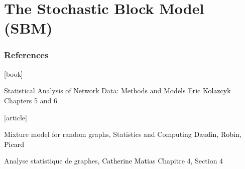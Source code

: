 \documentclass{beamer}\usepackage[]{graphicx}\usepackage[]{color}
\begin{document}
\section{The Stochastic Block Model (SBM)}

\begin{frame}
  \frametitle{References}

    \begin{thebibliography}{99}
      [book]

     Statistical Analysis of Network Data: Methods and Models
    \newblock \textcolor{black}{Eric Kolazcyk}
    \newblock \alert{Chapters 5 and 6}

      [article]

     Mixture model for random graphs, Statistics and Computing
    \newblock \textcolor{black}{Daudin, Robin, Picard}

     Analyse statistique de graphes,
    \newblock \textcolor{black}{Catherine Matias}
    \newblock \alert{Chapitre 4, Section 4}

    \end{thebibliography}

\end{frame}
\end{document}
